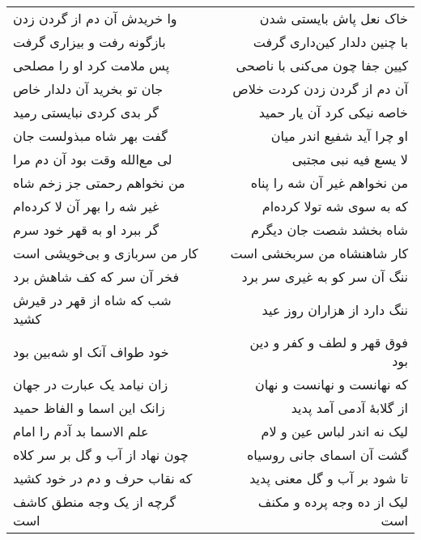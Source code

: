 \begin{center}
\begin{longtable}{l p{0.5cm} r}
وا خریدش آن دم از گردن زدن
&&
خاک نعل پاش بایستی شدن
\\
بازگونه رفت و بیزاری گرفت
&&
با چنین دلدار کین‌داری گرفت
\\
پس ملامت کرد او را مصلحی
&&
کیین جفا چون می‌کنی با ناصحی
\\
جان تو بخرید آن دلدار خاص
&&
آن دم از گردن زدن کردت خلاص
\\
گر بدی کردی نبایستی رمید
&&
خاصه نیکی کرد آن یار حمید
\\
گفت بهر شاه مبذولست جان
&&
او چرا آید شفیع اندر میان
\\
لی مع‌الله وقت بود آن دم مرا
&&
لا یسع فیه نبی مجتبی
\\
من نخواهم رحمتی جز زخم شاه
&&
من نخواهم غیر آن شه را پناه
\\
غیر شه را بهر آن لا کرده‌ام
&&
که به سوی شه تولا کرده‌ام
\\
گر ببرد او به قهر خود سرم
&&
شاه بخشد شصت جان دیگرم
\\
کار من سربازی و بی‌خویشی است
&&
کار شاهنشاه من سربخشی است
\\
فخر آن سر که کف شاهش برد
&&
ننگ آن سر کو به غیری سر برد
\\
شب که شاه از قهر در قیرش کشید
&&
ننگ دارد از هزاران روز عید
\\
خود طواف آنک او شه‌بین بود
&&
فوق قهر و لطف و کفر و دین بود
\\
زان نیامد یک عبارت در جهان
&&
که نهانست و نهانست و نهان
\\
زانک این اسما و الفاظ حمید
&&
از گلابهٔ آدمی آمد پدید
\\
علم الاسما بد آدم را امام
&&
لیک نه اندر لباس عین و لام
\\
چون نهاد از آب و گل بر سر کلاه
&&
گشت آن اسمای جانی روسیاه
\\
که نقاب حرف و دم در خود کشید
&&
تا شود بر آب و گل معنی پدید
\\
گرچه از یک وجه منطق کاشف است
&&
لیک از ده وجه پرده و مکنف است
\\
\end{longtable}
\end{center}
